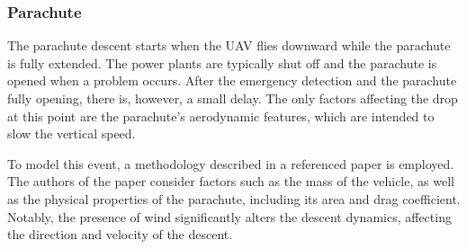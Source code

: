 \documentclass[12pt]{report}
\begin{document}
        \subsubsection{Parachute}
        The parachute descent starts when the UAV flies downward while the parachute is fully extended. The power plants
        are typically shut off and the parachute is opened when a problem occurs. After the emergency detection and the
        parachute fully opening, there is, however, a small delay. The only factors affecting the drop at this point are
        the parachute's aerodynamic features, which are intended to slow the vertical speed.
            
        To model this event, a methodology described in a referenced paper \cite{la_cour-harbo_quantifying_2019}is employed. The authors of the paper
        consider factors such as the mass of the vehicle, as well as the physical properties of the parachute, including
        its area and drag coefficient. Notably, the presence of wind significantly alters the descent dynamics,
        affecting the direction and velocity of the descent.
\end{document}

